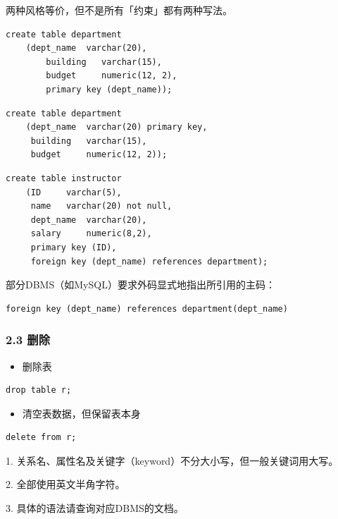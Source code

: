 \documentclass[aspectratio=169, 14pt]{beamer}
\begin{document}
\begin{frame}[fragile]
	两种风格等价，但不是所有「约束」都有两种写法。

	\begin{verbatim}
create table department
    (dept_name  varchar(20),
        building   varchar(15),
        budget     numeric(12, 2),
        primary key (dept_name)); 
    \end{verbatim}

	\begin{verbatim}
create table department
    (dept_name  varchar(20) primary key,
     building   varchar(15),
     budget     numeric(12, 2)); 
        \end{verbatim}

\end{frame}

\begin{frame}[fragile]
	\begin{verbatim}
create table instructor
    (ID     varchar(5), 
     name   varchar(20) not null, 
     dept_name  varchar(20),
     salary     numeric(8,2),
     primary key (ID),
     foreign key (dept_name) references department);
    \end{verbatim}
	\pause
	部分DBMS（如MySQL）要求外码显式地指出所引用的主码：
	\begin{verbatim}
foreign key (dept_name) references department(dept_name)
\end{verbatim}
\end{frame}

\begin{frame}[fragile]
	\frametitle{2.3 删除}
	\begin{itemize}
		\item 删除表
	\end{itemize}
	\begin{verbatim}
drop table r;
\end{verbatim}

	\begin{itemize}
		\item 清空表数据，但保留表本身
	\end{itemize}
	\begin{verbatim}
delete from r;
\end{verbatim}
\end{frame}

{
\begin{frame}[standout]
	1. 关系名、属性名及关键字（keyword）不分大小写，但一般关键词用大写。

	2. 全部使用英文半角字符。

	3. 具体的语法请查询对应DBMS的文档。
\end{frame}
}
\end{document}
